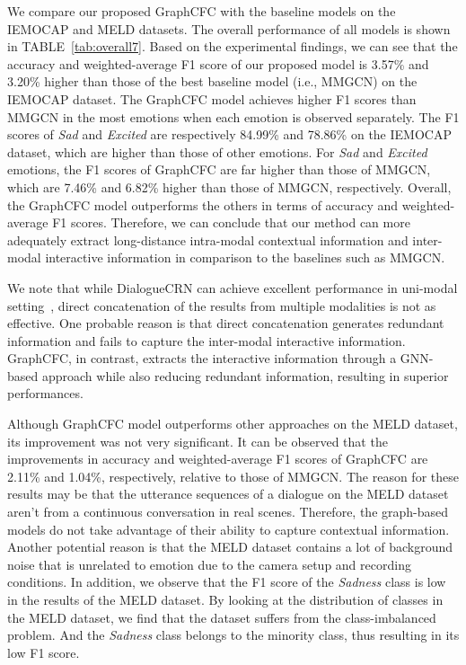 \documentclass[lettersize,journal]{IEEEtran}
\begin{document}
\begin{table*}[htbp]
\begin{threeparttable}
\end{threeparttable}
\end{table*}We compare our proposed GraphCFC with the baseline models on the IEMOCAP and MELD datasets. The overall performance of all models is shown in TABLE~\ref{tab:overall7}. Based on the experimental findings, we can see that the accuracy and weighted-average F1 score of our proposed model is 3.57\% and 3.20\% higher than those of the best baseline model (i.e., MMGCN) on the IEMOCAP dataset. The GraphCFC model achieves higher F1 scores than MMGCN in the most emotions when each emotion is observed separately. The F1 scores of \textit{Sad} and \textit{Excited} are respectively 84.99\% and 78.86\% on the IEMOCAP dataset, which are higher than those of other emotions. For \textit{Sad} and \textit{Excited} emotions, the F1 scores of GraphCFC are far higher than those of MMGCN, which are 7.46\% and 6.82\% higher than those of MMGCN, respectively. Overall, the GraphCFC model outperforms the others in terms of accuracy and weighted-average F1 scores. Therefore, we can conclude that our method can more adequately extract long-distance intra-modal contextual information and inter-modal interactive information in comparison to the baselines such as MMGCN.

We note that while DialogueCRN can achieve excellent performance in uni-modal setting~\cite{hu2021dialoguecrn}, direct concatenation of the results from multiple modalities is not as effective. One probable reason is that direct concatenation generates redundant information and fails to capture the inter-modal interactive information. GraphCFC, in contrast, extracts the interactive information through a GNN-based approach while also reducing redundant information, resulting in superior performances.

Although GraphCFC model outperforms other approaches on the MELD dataset, its improvement was not very significant. It can be observed that the improvements in accuracy and weighted-average F1 scores of GraphCFC are 2.11\% and 1.04\%, respectively, relative to those of MMGCN. The reason for these results may be that the utterance sequences of a dialogue on the MELD dataset aren't from a continuous conversation in real scenes. Therefore, the graph-based models do not take advantage of their ability to capture contextual information. Another potential reason is that the MELD dataset contains a lot of background noise that is unrelated to emotion due to the camera setup and recording conditions. In addition, we observe that the F1 score of the \textit{Sadness} class is low in the results of the MELD dataset. By looking at the distribution of classes in the MELD dataset, we find that the dataset suffers from the class-imbalanced problem. And the \textit{Sadness} class belongs to the minority class, thus resulting in its low F1 score.
\end{document}
